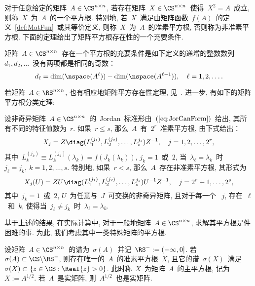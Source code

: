 对于任意给定的矩阵~$A\in\CS^{n\times n}$,
若存在矩阵~$X\in\CS^{n\times n}$~使得~$X^2 = A$~成立,
则称~$X$~为~$A$~的一个平方根. 特别地,
若~$X$~满足由矩阵函数~$f(A)$~的定义~\ref{def:MatFun}~或其等价定义,
则称~$X$~为~$A$~的准素平方根, 否则称为非准素平方根.
下面的定理给出了矩阵平方根存在性的一个充要条件.

\begin{theorem}
\label{th:MatSquRoot_Existence} 矩阵~$A\in\CS^{n\times
n}$~存在一个平方根的充要条件是如下定义的递增的整数数列~$d_1,
d_2,\ldots$~没有两项都是相同的奇数：
$$
d_\ell = \dim(\nspace(A^\ell)) - \dim(\nspace(A^{\ell-1})), \ \ \
\ell = 1,2,\ldots.
$$
\end{theorem}

若矩阵~$A\in\RS^{n\times n}$, 也有相应地矩阵平方存在性定理,
见~\cite[定理~1.23]{Higham2008}. 进一步, 有如下的矩阵平方根分类定理:

\begin{theorem}
\label{th:MatSquRoot_Classification} 设非奇异矩阵~$A\in\CS^{n\times
n}$~的~Jordan~标准形由~$(\ref{eq:JorCanForm})$~给出,
其所有不同的特征值数为~$r$.  如果~$r\leq s$,
那么~$A$~有~$2^r$~准素平方根, 由下式给出：
$$
X_j = Z \diag(L_1^{(j_1)},L_2^{(j_2)},\ldots,L_s^{j_s})Z^{-1},\ \ \
j = 1, 2, \ldots, 2^r,
$$
其中~$L_k^{(j_k)} \equiv L_k^{(j_k)}(\lambda_k) =
f(J_k(\lambda_k))$, $j_k = 1$~或~$2$, 当~$\lambda_\ell =
\lambda_k$~时~$j_\ell = j_k,\ k=1,2,\ldots,s$. 特别地, 如果~$r<s$,
那么~$A$~存在非准素平方根, 其形式为
$$
X_j(U) =
ZU\diag(L_1^{(j_1)},L_2^{(j_2)},\ldots,L_s^{j_s})U^{-1}Z^{-1}, \ \ \
j=2^r+1, \ldots, 2^s,
$$
其中~$j_k = 1$~或~$2$, $U$~为任意与~$J$~可交换的非奇异矩阵,
且对于每一个 ~$j$, 存在~$\ell$~和~$k$, 使得当~$j_\ell\neq
j_k$~时~$\lambda_\ell = \lambda_k$.
\end{theorem}

基于上述的结果, 在实际计算中, 对于一般地矩阵~$A\in\CS^{n\times n}$,
求解其平方根是件困难的事. 为此, 我们考虑其中一类特殊矩阵的平方根.

\begin{definition}[矩阵主平方根, {\cite[定理~1.29]{Higham2008}}]
\label{th:MatSquRoot_Principal} 设矩阵~$A\in\CS^{n\times
n}$~的谱为~$\sigma(A)$~并记~$\RS^- := (-\infty,0]$. 若~$\sigma(A)
\subset \CS\backslash\RS^-$, 则存在唯一的~$A$~的准素平方根~$X$,
且它的谱~$\sigma(X)$~满足~$\sigma(X)\subset \{z\in\CS:
\Real{z}>0\}$. 此时称~$X$~为矩阵~$A$~的主平方根, 记为~$X :=
A^{1/2}$. 若~$A$~是实矩阵, 则~$A^{1/2}$~也是实矩阵.
\end{definition}



